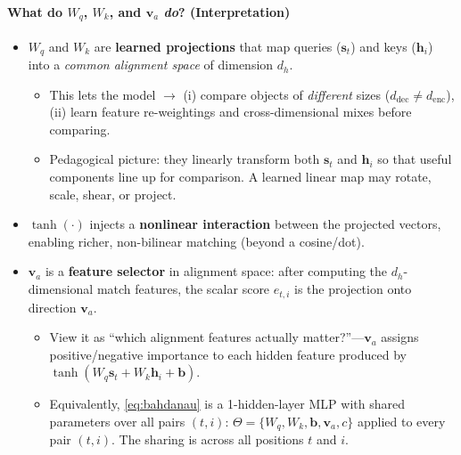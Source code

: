 \documentclass{article}
\begin{document}
\paragraph{What do \(W_q\), \(W_k\), and \(\bm{v}_a\) \emph{do}? (Interpretation)}
\begin{itemize}
  \item \(\boxed{W_q}\) and \(\boxed{W_k}\) are \textbf{learned projections} that map queries (\(\bm{s}_t\)) and keys (\(\bm{h}_i\)) into a \emph{common alignment space} of dimension \(d_h\).
  \begin{itemize}
    \item This lets the model \(\rightarrow\) (i) compare objects of \emph{different} sizes (\(d_{\text{dec}}\neq d_{\text{enc}}\)), (ii) learn feature re-weightings and cross-dimensional mixes before comparing.
    \item Pedagogical picture: they linearly transform both \(\bm{s}_t\) and
    \(\bm{h}_i\) so that useful components line up for comparison. A learned linear
    map may rotate, scale, shear, or project.
  \end{itemize}
  \item \(\boxed{\tanh(\cdot)}\) injects a \textbf{nonlinear interaction} between the projected vectors, enabling richer, non-bilinear matching (beyond a cosine/dot).
  \item \(\boxed{\bm{v}_a}\) is a \textbf{feature selector} in alignment space: after computing the \(d_h\)-dimensional match features, the scalar score \(e_{t,i}\) is the projection onto direction \(\bm{v}_a\).
  \begin{itemize}
    \item View it as ``which alignment features actually matter?”—\(\bm{v}_a\) assigns positive/negative importance to each hidden feature produced by \(\tanh(W_q\bm{s}_t+W_k\bm{h}_i+\bm{b})\).
    \item Equivalently, \eqref{eq:bahdanau} is a 1-hidden-layer MLP with shared parameters over all pairs \((t,i)\): \(\Theta=\{W_q,W_k,\bm{b},\bm{v}_a,c\}\) applied to every pair \((t,i)\). The sharing is across all positions \(t\) and \(i\).

  \end{itemize}
\end{itemize}
\end{document}
